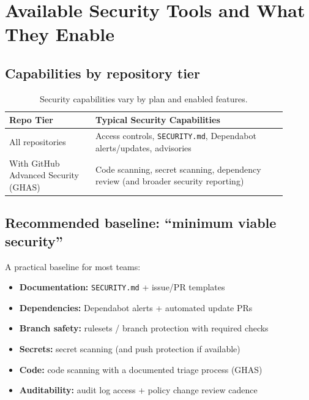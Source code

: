 \documentclass[11pt]{article}
\newcommand{\ghas}{\textsf{GitHub Advanced Security (GHAS)}}
\begin{document}
\section{Available Security Tools and What They Enable}

\subsection{Capabilities by repository tier}
\begin{table}[!htbp]
\centering
\begin{tabular}{@{}p{0.28\linewidth}p{0.62\linewidth}@{}}
\toprule
\textbf{Repo Tier} & \textbf{Typical Security Capabilities} \\
\midrule
All repositories & Access controls, \texttt{SECURITY.md}, Dependabot alerts/updates, advisories \\
With \ghas & Code scanning, secret scanning, dependency review (and broader security reporting) \\
\bottomrule
\end{tabular}
\caption{Security capabilities vary by plan and enabled features.}
\end{table}

\subsection{Recommended baseline: ``minimum viable security''}
A practical baseline for most teams:

\begin{checklistbox}
\begin{itemize}[leftmargin=*,itemsep=2pt]
  \item \textbf{Documentation:} \texttt{SECURITY.md} + issue/PR templates
  \item \textbf{Dependencies:} Dependabot alerts + automated update PRs
  \item \textbf{Branch safety:} rulesets / branch protection with required checks
  \item \textbf{Secrets:} secret scanning (and push protection if available)
  \item \textbf{Code:} code scanning with a documented triage process (GHAS)
  \item \textbf{Auditability:} audit log access + policy change review cadence
\end{itemize}
\end{checklistbox}
\end{document}
